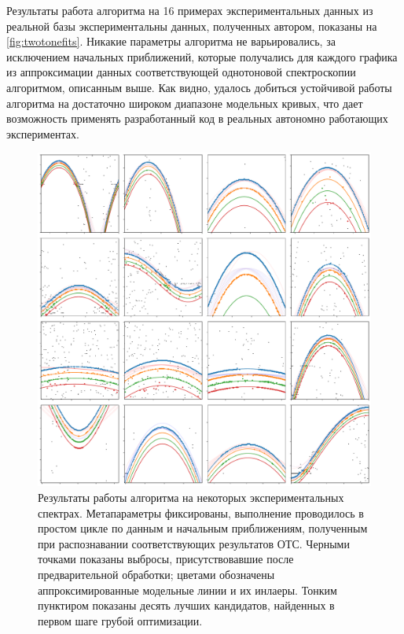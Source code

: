 \documentclass[14pt, a4paper]{extarticle}
\begin{document}
Результаты работа алгоритма на 16 примерах экспериментальных данных из реальной базы экспериментальны данных, полученных автором, показаны на \autoref{fig:twotonefits}. Никакие параметры алгоритма не варьировались, за исключением начальных приближений, которые получались для каждого графика из аппроксимации данных соответствующей однотоновой спектроскопии алгоритмом, описанным выше. Как видно, удалось добиться устойчивой работы алгоритма на достаточно широком диапазоне модельных кривых, что дает возможность применять разработанный код в реальных автономно работающих экспериментах.

\begin{figure}
	\includegraphics[width=1\linewidth]{Pictures/two_tone_fits}
	\caption{Результаты работы алгоритма на некоторых экспериментальных спектрах. Метапараметры фиксированы, выполнение проводилось в простом цикле по данным и начальным приближениям, полученным при распознавании соответствующих результатов ОТС. Черными точками показаны выбросы, присутствовавшие после предварительной обработки; цветами обозначены аппроксимированные модельные линии и их инлаеры. Тонким пунктиром показаны десять лучших кандидатов, найденных в первом шаге грубой оптимизации.}
	\label{fig:twotonefits}
\end{figure}
\end{document}
